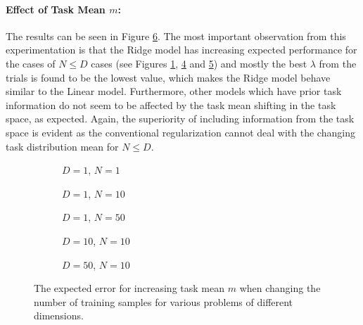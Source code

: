 \paragraph{Effect of Task Mean $m$:} The results can be seen in Figure \ref{fig:linear-m}. The most important observation from this experimentation is that the Ridge model has increasing expected performance for the cases of $N\leq D$ cases (see Figures \ref{fig:linear-m-N-1-D-1}, \ref{fig:linear-m-N-10-D-10} and \ref{fig:linear-m-N-10-D-50}) and mostly the best $\lambda$ from the trials is found to be the lowest value, which makes the Ridge model behave similar to the Linear model. Furthermore, other models which have prior task information do not seem to be affected by the task mean shifting in the task space, as expected. Again, the superiority of including information from the task space is evident as the conventional regularization cannot deal with the changing task distribution mean for $N\leq D$.

\begin{figure}[!h]
  \centering
    \begin{subfigure}{0.3\textwidth}
      \centering
      \caption{$D=1$, $N=1$}
      \label{fig:linear-m-N-1-D-1}
    \end{subfigure}
    \begin{subfigure}{0.3\textwidth}
      \centering
      \caption{$D=1$, $N=10$}
      \label{fig:linear-m-N-10-D-1}
    \end{subfigure}
    \begin{subfigure}{0.3\textwidth}
      \centering
      \caption{$D=1$, $N=50$}
      \label{fig:linear-m-N-50-D-1}
    \end{subfigure}

    \begin{subfigure}{0.3\textwidth}
      \centering
      \caption{$D=10$, $N=10$}
      \label{fig:linear-m-N-10-D-10}
    \end{subfigure}
    \begin{subfigure}{0.3\textwidth}
      \centering
      \caption{$D=50$, $N=10$}
      \label{fig:linear-m-N-10-D-50}
    \end{subfigure}  

  \caption{The expected error for increasing task mean $m$ when changing the number of training samples for various problems of different dimensions.}
  \label{fig:linear-m}
\end{figure}

